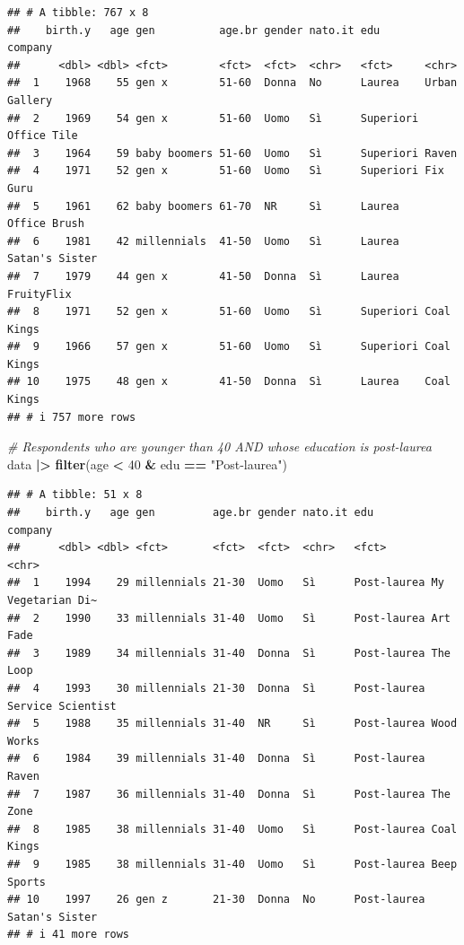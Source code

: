 \documentclass[
]{book}
\newenvironment{Shaded}{\begin{snugshade}}{\end{snugshade}}
\newcommand{\CommentTok}[1]{\textcolor[rgb]{0.56,0.35,0.01}{\textit{#1}}}
\newcommand{\DecValTok}[1]{\textcolor[rgb]{0.00,0.00,0.81}{#1}}
\newcommand{\FunctionTok}[1]{\textcolor[rgb]{0.13,0.29,0.53}{\textbf{#1}}}
\newcommand{\NormalTok}[1]{#1}
\newcommand{\SpecialCharTok}[1]{\textcolor[rgb]{0.81,0.36,0.00}{\textbf{#1}}}
\newcommand{\StringTok}[1]{\textcolor[rgb]{0.31,0.60,0.02}{#1}}
\begin{document}
\begin{verbatim}
## # A tibble: 767 x 8
##    birth.y   age gen          age.br gender nato.it edu       company       
##      <dbl> <dbl> <fct>        <fct>  <fct>  <chr>   <fct>     <chr>         
##  1    1968    55 gen x        51-60  Donna  No      Laurea    Urban Gallery 
##  2    1969    54 gen x        51-60  Uomo   Sì      Superiori Office Tile   
##  3    1964    59 baby boomers 51-60  Uomo   Sì      Superiori Raven         
##  4    1971    52 gen x        51-60  Uomo   Sì      Superiori Fix Guru      
##  5    1961    62 baby boomers 61-70  NR     Sì      Laurea    Office Brush  
##  6    1981    42 millennials  41-50  Uomo   Sì      Laurea    Satan's Sister
##  7    1979    44 gen x        41-50  Donna  Sì      Laurea    FruityFlix    
##  8    1971    52 gen x        51-60  Uomo   Sì      Superiori Coal Kings    
##  9    1966    57 gen x        51-60  Uomo   Sì      Superiori Coal Kings    
## 10    1975    48 gen x        41-50  Donna  Sì      Laurea    Coal Kings    
## # i 757 more rows
\end{verbatim}

\begin{Shaded}
\begin{Highlighting}[]
\CommentTok{\# Respondents who are younger than 40 AND whose education is post{-}laurea}
\NormalTok{data }\SpecialCharTok{|\textgreater{}} 
  \FunctionTok{filter}\NormalTok{(age }\SpecialCharTok{\textless{}} \DecValTok{40} \SpecialCharTok{\&}\NormalTok{ edu }\SpecialCharTok{==} \StringTok{"Post{-}laurea"}\NormalTok{)}
\end{Highlighting}
\end{Shaded}

\begin{verbatim}
## # A tibble: 51 x 8
##    birth.y   age gen         age.br gender nato.it edu         company          
##      <dbl> <dbl> <fct>       <fct>  <fct>  <chr>   <fct>       <chr>            
##  1    1994    29 millennials 21-30  Uomo   Sì      Post-laurea My Vegetarian Di~
##  2    1990    33 millennials 31-40  Uomo   Sì      Post-laurea Art Fade         
##  3    1989    34 millennials 31-40  Donna  Sì      Post-laurea The Loop         
##  4    1993    30 millennials 21-30  Donna  Sì      Post-laurea Service Scientist
##  5    1988    35 millennials 31-40  NR     Sì      Post-laurea Wood Works       
##  6    1984    39 millennials 31-40  Donna  Sì      Post-laurea Raven            
##  7    1987    36 millennials 31-40  Donna  Sì      Post-laurea The Zone         
##  8    1985    38 millennials 31-40  Uomo   Sì      Post-laurea Coal Kings       
##  9    1985    38 millennials 31-40  Uomo   Sì      Post-laurea Beep Sports      
## 10    1997    26 gen z       21-30  Donna  No      Post-laurea Satan's Sister   
## # i 41 more rows
\end{verbatim}
\end{document}
